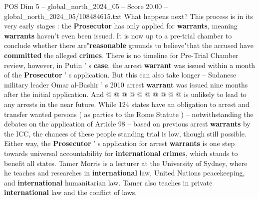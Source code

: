 \begin{textsample}{POS Dim 5 – global\_north\_2024\_05 – Score 20.00 – global\_north\_2024\_05/108484615.txt}
What happens next?
This process is in its very early stages : the \textbf{Prosecutor} has only applied for \textbf{warrants}, meaning \textbf{warrants} haven't even been issued.
It is now up to a pre-trial chamber to conclude whether there are"\textbf{reasonable} grounds to believe"that the accused have \textbf{committed} the alleged \textbf{crimes}.
There is no timeline for Pre-Trial Chamber review, however, in Putin ' s \textbf{case}, the arrest \textbf{warrant} was issued within a month of the \textbf{Prosecutor} ' s application.
But this can also take longer -- Sudanese military leader Omar al-Bashir ' s 2010 arrest \textbf{warrant} was issued nine months after the initial application.
And @ @ @ @ @ @ @ @ @ @ is unlikely to lead to any arrests in the near future.
While 124 states have an obligation to arrest and transfer wanted persons ( as parties to the Rome Statute ) -- notwithstanding the debates on the application of Article 98 -- based on previous arrest \textbf{warrants} by the ICC, the chances of these people standing trial is low, though still possible.
Either way, the \textbf{Prosecutor} ' s application for arrest \textbf{warrants} is one step towards universal accountability for \textbf{international} \textbf{crimes}, which stands to benefit all states.
Tamer Morris is a lecturer at the University of Sydney, where he teaches and researches in \textbf{international} law, United Nations peacekeeping, and \textbf{international} humanitarian law.
Tamer also teaches in private \textbf{international} law and the conflict of laws.

\end{textsample}
